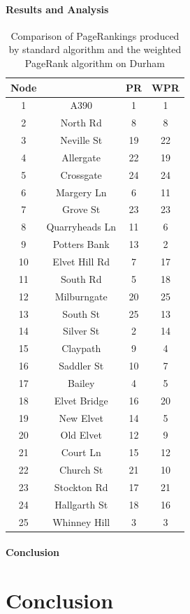 \documentclass[11pt]{report}
\begin{document}
\subsubsection{Results and Analysis}
\begin{table}[h] \caption{Comparison of PageRankings produced by standard algorithm and the weighted PageRank algorithm on Durham}
 \centering
 \begin{tabular} {c c| c c} 
 Node & & PR & WPR \\ [0.5ex] 
 \hline
 1&A390&1&1\\
 2&North Rd&8&8\\
 3&Neville St&19&22\\
 4&Allergate&22&19\\
 5&Crossgate&24&24\\
 6&Margery Ln&6&11\\
 7&Grove St&23&23\\
 8&Quarryheads Ln&11&6\\
 9&Potters Bank&13&2\\
 10&Elvet Hill Rd&7&17\\
 11&South Rd&5&18\\
 12&Milburngate&20&25\\
 13&South St&25&13\\
 14&Silver St&2&14\\
 15&Claypath&9&4\\
 16&Saddler St&10&7\\
 17&Bailey&4&5\\
 18&Elvet Bridge&16&20\\
 19&New Elvet&14&5\\
 20&Old Elvet&12&9\\
 21&Court Ln&15&12\\
 22&Church St&21&10\\
 23&Stockton Rd&17&21\\
 24&Hallgarth St&18&16\\
 25&Whinney Hill&3&3\\
 
 \end{tabular}
 \label{Durham comparison}
\end{table}

\subsubsection{Conclusion}

\chapter{Conclusion}


\end{document}
